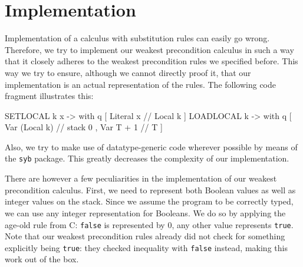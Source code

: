 \documentclass[a4paper]{article}
\begin{document}
\begin{comment}
whileInst 0 _ = boundT 0 && (fromStack 0 `EQ` 0  `whileOp` with q [ Var T - 1 // T ])

whileInst n s = boundT 0 && (fromStack 0 `NEQ` 0 `whileOp` wp' (I.POP:s) (whileInst (n-1) s) post) `whileJunc` whileInst (n-1) s
\end{comment}

\section{Implementation}
Implementation of a calculus with substitution rules can easily go wrong. Therefore, we try to implement our weakest precondition calculus in such a way that it closely adheres to the weakest precondition rules we specified before. This way we try to ensure, although we cannot directly proof it, that our implementation is an actual representation of the rules. The following code fragment illustrates this:

\begin{haskell}
    SETLOCAL  k x -> with q [ Literal x // Local k     ]
    LOADLOCAL k   -> with q [ Var (Local k) // stack 0
                            , Var T + 1 // T           ]
\end{haskell}

Also, we try to make use of datatype-generic code wherever possible by means of the \texttt{syb} package. This greatly decreases the complexity of our implementation.

There are however a few peculiarities in the implementation of our weakest precondition calculus. First, we need to represent both Boolean values as well as integer values on the stack. Since we assume the program to be correctly typed, we can use any integer representation for Booleans. We do so by applying the age-old rule from C: \texttt{false} is represented by $0$, any other value represents \texttt{true}. Note that our weakest precondition rules already did not check for something explicitly being \texttt{true}: they checked inequality with \texttt{false} instead, making this work out of the box.
\end{document}
